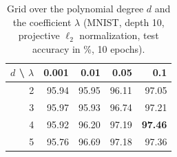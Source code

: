 \begin{table}[t]
\centering
\caption{Grid over the polynomial degree $d$ and the coefficient $\lambda$ (MNIST, depth 10, projective $\ell_2$ normalization, test accuracy in \%, 10 epochs).}
\label{tab:degree}
\small
\begin{tabular}{rrrrr}
\toprule
$d$ \textbackslash{} $\lambda$ & 0.001 & 0.01 & 0.05 & 0.1 \\
\midrule
2 & 95.94 & 95.95 & 96.11 & 97.05 \\
3 & 95.97 & 95.93 & 96.74 & 97.21 \\
4 & 95.92 & 96.20 & 97.19 & \textbf{97.46} \\
5 & 95.76 & 96.69 & 97.18 & 97.36 \\
\bottomrule
\end{tabular}
\end{table}